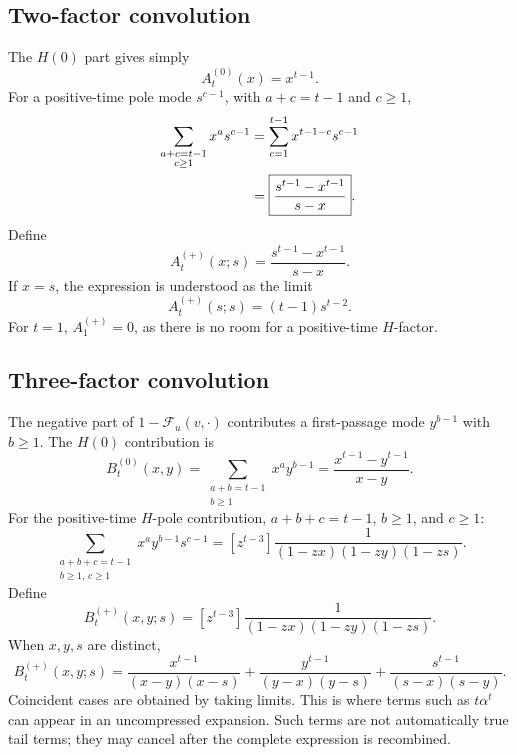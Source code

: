 \documentclass[11pt]{article}
\newcommand{\Fcal}{\mathcal{F}}
\begin{document}
\subsection*{Two-factor convolution}

The \(H(0)\) part gives simply
\begin{equation}
  A^{(0)}_t(x)=x^{t-1}.
  \label{eq:A0-kernel}
\end{equation}
For a positive-time pole mode \(s^{c-1}\), with \(a+c=t-1\) and \(c\ge1\),
\begin{align}
  \sum_{\substack{a+c=t-1\\c\ge1}}x^a s^{c-1}
  &=\sum_{c=1}^{t-1}x^{t-1-c}s^{c-1}\notag\\
  &=\boxed{\frac{s^{t-1}-x^{t-1}}{s-x}}.
  \label{eq:A-kernel-derivation}
\end{align}
Define
\begin{equation}
  \boxed{A^{(+)}_t(x;s)=\frac{s^{t-1}-x^{t-1}}{s-x}}.
  \label{eq:A-kernel}
\end{equation}
If \(x=s\), the expression is understood as the limit
\[
  A^{(+)}_t(s;s)=(t-1)s^{t-2}.
\]
For \(t=1\), \(A^{(+)}_1=0\), as there is no room for a positive-time
\(H\)-factor.

\subsection*{Three-factor convolution}

The negative part of \(1-\Fcal_u(v,\cdot)\) contributes a first-passage mode
\(y^{b-1}\) with \(b\ge1\).  The \(H(0)\) contribution is
\begin{equation}
  \boxed{
  B^{(0)}_t(x,y)=
  \sum_{\substack{a+b=t-1\\b\ge1}}x^a y^{b-1}
  =
  \frac{x^{t-1}-y^{t-1}}{x-y}.}
  \label{eq:B0-kernel}
\end{equation}
For the positive-time \(H\)-pole contribution, \(a+b+c=t-1\), \(b\ge1\),
and \(c\ge1\):
\begin{equation}
  \sum_{\substack{a+b+c=t-1\\b\ge1,\,c\ge1}}x^a y^{b-1}s^{c-1}
  =
  [z^{t-3}]
  \frac{1}{(1-zx)(1-zy)(1-zs)}.
\end{equation}
Define
\begin{equation}
  \boxed{
  B^{(+)}_t(x,y;s)=
  [z^{t-3}]
  \frac{1}{(1-zx)(1-zy)(1-zs)}.}
  \label{eq:B-kernel}
\end{equation}
When \(x,y,s\) are distinct,
\begin{equation}
  \boxed{
  B^{(+)}_t(x,y;s)=
  \frac{x^{t-1}}{(x-y)(x-s)}
  +\frac{y^{t-1}}{(y-x)(y-s)}
  +\frac{s^{t-1}}{(s-x)(s-y)}.}
  \label{eq:B-kernel-distinct}
\end{equation}
Coincident cases are obtained by taking limits.  This is where terms such as
\(t\alpha^t\) can appear in an uncompressed expansion.  Such terms are not
automatically true tail terms; they may cancel after the complete expression is
recombined.
\end{document}
